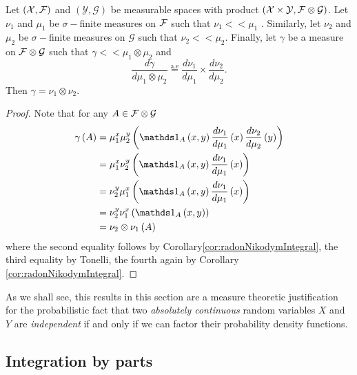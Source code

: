 \begin{prop}
\label{prop:prodRNConverse}Let $\left(\mathcal{X},\mathcal{F}\right)$ and $\left(\mathcal{Y},\mathcal{G}\right)$
be measurable spaces with product $\left(\mathcal{X}\times\mathcal{Y},\mathcal{F}\otimes\mathcal{G}\right)$.
Let $\nu_{1}$ and $\mu_{1}$ be $\sigma-$finite measures on $\mathcal{F}$
such that $\nu_{1}<<\mu_{1}$ . Similarly, let $\nu_{2}$ and $\mu_{2}$
be $\sigma-$finite measures on $\mathcal{G}$ such that $\nu_{2}<<\mu_{2}$.
Finally, let $\gamma$ be a measure on $\mathcal{F}\otimes\mathcal{G}$ such
that $\gamma<<\mu_{1}\otimes\mu_{2}$ and
\[
\frac{d\gamma}{d\mu_{1}\otimes\mu_{2}}\stackrel{\text{a.e}}{=}\frac{d\nu_{1}}{d\mu_{1}}\times\frac{d\nu_{2}}{d\mu_{2}}.
\]
Then $\gamma=\nu_{1}\otimes\nu_{2}$.
\end{prop}

\begin{proof}
Note that for any $A\in\mathcal{F}\otimes\mathcal{G}$
\begin{align*}
\gamma\left(A\right) & =\mu_{1}^{x}\mu_{2}^{y}\left(\indicate_{A}\left(x,y\right)\frac{d\nu_{1}}{d\mu_{1}}\left(x\right)\frac{d\nu_{2}}{d\mu_{2}}\left(y\right)\right)\\
 & =\mu_{1}^{x}\nu_{2}^{y}\left(\indicate_{A}\left(x,y\right)\frac{d\nu_{1}}{d\mu_{1}}\left(x\right)\right)\\
 & =\nu_{2}^{y}\mu_{1}^{x}\left(\indicate_{A}\left(x,y\right)\frac{d\nu_{1}}{d\mu_{1}}\left(x\right)\right)\\
 & =\nu_{2}^{y}\nu_{1}^{x}\left(\indicate_{A}\left(x,y\right)\right)\\
 & =\nu_{2}\otimes\nu_{1}\left(A\right)
\end{align*}
where the second equality follows by Corollary\ref{cor:radonNikodymIntegral},
the third equality by Tonelli, the fourth again by Corollary \ref{cor:radonNikodymIntegral}.
\end{proof}
\begin{rem*}
As we shall see, this results in this section are a measure theoretic
justification for the probabilistic fact that two \emph{absolutely
continuous }random variables $X$ and $Y$ are \emph{independent }if
and only if we can factor their probability density functions.
\end{rem*}

\subsection{Integration by parts}

